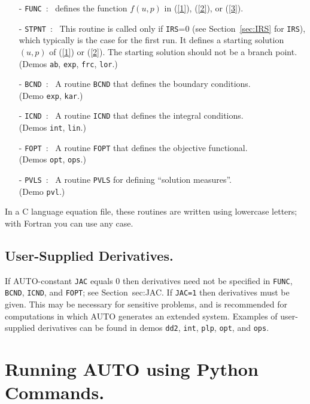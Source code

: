 \documentclass[12pt]{report}
\begin{document}
\begin{itemize}
\item[-] {\tt FUNC}~:~
  defines the function $f(u,p)$ in (\ref{1}), (\ref{2}), or (\ref{3}).
\item[-] {\tt STPNT}~:~
  This routine is called only if {\tt IRS}=0 
(see Section~\ref{sec:IRS} for {\tt IRS}),
  which typically is the case for the first run.
  It defines a starting solution $(u,p)$ of (\ref{1}) or (\ref{2}).
  The starting solution should not be a branch point.\\ 
  (Demos {\tt ab}, {\tt exp}, {\tt frc}, {\tt lor}.)  
\item[-] {\tt BCND}~:~ 
  A routine {\tt BCND} that defines the boundary conditions. \\
  (Demo {\tt exp}, {\tt kar}.)
\item[-] {\tt ICND}~:~ 
  A routine {\tt ICND} that defines the integral conditions. \\ 
  (Demos {\tt int}, {\tt lin}.)  
\item[-] {\tt FOPT}~:~ 
  A routine {\tt FOPT} that defines the objective functional. \\ 
  (Demos {\tt opt}, {\tt ops}.)  
\item[-] {\tt PVLS}~:~
  A routine {\tt PVLS} for defining ``solution measures''. \\
  (Demo {\tt pvl}.)
\end{itemize}

In a C language equation file, these routines are written using
lowercase letters; with Fortran you can use any case.
 
\section{ User-Supplied Derivatives.} \label{sec:derivatives}
If {\cal AUTO}-constant {\tt JAC} equals 0 
then derivatives need not be specified in 
{\tt FUNC}, {\tt BCND}, {\tt ICND}, and {\tt FOPT}; see Section~{sec:JAC}.
If {\tt JAC=1} then derivatives must be given.
This may be necessary for sensitive 
problems, and is recommended for computations in which {\cal AUTO} 
generates an extended system.
Examples of user-supplied derivatives can be found in
demos  {\tt dd2}, {\tt int}, {\tt plp}, {\tt opt}, and {\tt ops}.

\chapter{ Running {\cal AUTO} using Python Commands.} \label{ch:python_mode}
\end{document}
